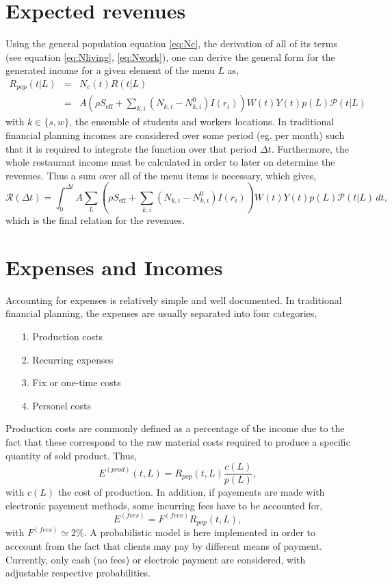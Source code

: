 \documentclass{article}
\begin{document}
\section{Expected revenues} \label{sec:4}

Using the general population equation \ref{eq:Nc}, the derivation of all of its terms (see equation \ref{eq:Nliving}, \ref{eq:Nwork}), one can derive the general form for the generated income for a given element of the menu $L$ as,
\begin{eqnarray}
    R_{pop}(t|L) &=& N_{c}(t) R(t | L) \\ \nonumber
      &=&  A \left( \rho S_{\mathrm{eff}} + \sum_{k,i} (N_{k,i} - N^{0}_{k,i}) I(r_i) \right) W(t) Y(t) p(L) \mathcal{P}(t|L) 
\end{eqnarray}
with $k \in \{s,w\}$, the ensemble of students and workers locations.
In traditional financial planning incomes are considered over some period (eg. per month) such that it is required to integrate the function over that period $\Delta t$. Furthermore, the whole restaurant income must be calculated in order to later on determine the revenues. Thus a sum over all of the menu items is necessary, which gives,
\begin{equation}
    \mathcal{R}(\Delta t) = \int^{\Delta t}_0 A \sum_L \left( \rho S_{\mathrm{eff}} + \sum_{k,i} (N_{k,i} - N^{0}_{k,i}) I(r_i) \right) W(t) Y(t) p(L) \mathcal{P}(t|L) \,dt ,
\end{equation}
which is the final relation for the revenues.

\section{Expenses and Incomes} \label{sec:5}

Accounting for expenses is relatively simple and well documented. In traditional financial planning, the expenses are usually separated into four categories,
\begin{itemize}
    \item[1.] Production costs
    \item[2.] Recurring expenses
    \item[3.] Fix or one-time costs
    \item[4.] Personel costs
\end{itemize}
Production costs are commonly defined as a percentage of the income due to the fact that these correspond to the raw material costs required to produce a specific quantity of sold product. Thus,
\begin{equation}
    E^{(prod)}(t, L) = R_{pop}(t,L) \frac{c(L)}{{p}(L)},
\end{equation}
with $c(L)$ the cost of production. In addition, if payements are made with electronic payement methods, some incurring fees have to be accounted for,
\begin{equation}
    E^{(fees)} = F^{(fees)} R_{pop}(t, L),
\end{equation}
with $F^{(fees)} \simeq 2\%$.
A probabilistic model is here implemented in order to acccount from the fact that clients may pay by different means of payment. Currently, only cash (no fees) or electroic payment are considered, with adjustable respective probabilities.
\end{document}
